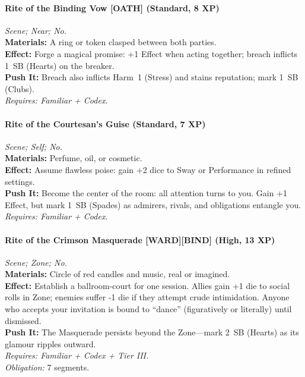 \paragraph{Rite of the Binding Vow \textnormal{[OATH]} (Standard, 8 XP)} \emph{Scene; Near; No.}\\
\textbf{Materials:} A ring or token clasped between both parties.\\
\textbf{Effect:} Forge a magical promise: +1 Effect when acting together; breach inflicts 1~SB (Hearts) on the breaker.\\
\textbf{Push It:} Breach also inflicts Harm~1 (Stress) and stains reputation; mark 1~SB (Clubs).\\
\emph{Requires: Familiar + Codex.}

\paragraph{Rite of the Courtesan’s Guise (Standard, 7 XP)} \emph{Scene; Self; No.}\\
\textbf{Materials:} Perfume, oil, or cosmetic.\\
\textbf{Effect:} Assume flawless poise: gain +2 dice to Sway or Performance in refined settings.\\
\textbf{Push It:} Become the center of the room: all attention turns to you. Gain +1 Effect, but mark 1~SB (Spades) as admirers, rivals, and obligations entangle you.\\
\emph{Requires: Familiar + Codex.}

\paragraph{Rite of the Crimson Masquerade \textnormal{[WARD][BIND]} (High, 13 XP)} \emph{Scene; Zone; No.}\\
\textbf{Materials:} Circle of red candles and music, real or imagined.\\
\textbf{Effect:} Establish a ballroom-court for one session. Allies gain +1 die to social rolls in Zone; enemies suffer -1 die if they attempt crude intimidation. Anyone who accepts your invitation is bound to “dance” (figuratively or literally) until dismissed.\\
\textbf{Push It:} The Masquerade persists beyond the Zone—mark 2~SB (Hearts) as its glamour ripples outward.\\
\emph{Requires: Familiar + Codex + Tier III.}\\
\emph{Obligation:} 7 segments.

